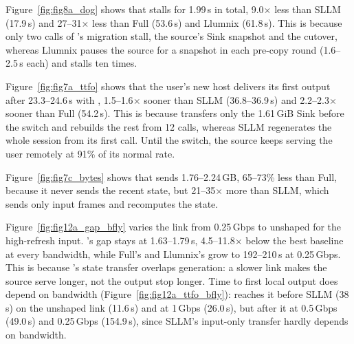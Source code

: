 Figure~\ref{fig:fig8a_dog} shows that \sys stalls for 1.99\,s in total, 9.0$\times$ less than SLLM (17.9\,s) and
27--31$\times$ less than Full (53.6\,s) and Llumnix (61.8\,s).
This is because only two calls of \sys's migration stall, the source's Sink snapshot and the cutover, whereas
Llumnix pauses the source for a snapshot in each pre-copy round (1.6--2.5\,s each) and stalls ten times.

Figure~\ref{fig:fig7a_ttfo} shows that the user's new host delivers its first output after 23.3--24.6\,s with \sys,
1.5--1.6$\times$ sooner than SLLM (36.8--36.9\,s) and 2.2--2.3$\times$ sooner than Full (54.2\,s).
This is because \sys transfers only the 1.61\,GiB Sink before the switch and rebuilds the rest from 12 calls, whereas
SLLM regenerates the whole session from its first call.
Until the switch, the source keeps serving the user remotely at 91\% of its normal rate.

Figure~\ref{fig:fig7c_bytes} shows that \sys sends 1.76--2.24\,GB, 65--73\% less than Full, because it never sends the
recent state, but 21--35$\times$ more than SLLM, which sends only input frames and recomputes the state.

Figure~\ref{fig:fig12a_gap_bfly} varies the link from 0.25\,Gbps to unshaped for the high-refresh input.
\sys's gap stays at 1.63--1.79\,s, 4.5--11.8$\times$ below the best baseline at every bandwidth, while Full's and
Llumnix's grow to 192--210\,s at 0.25\,Gbps.
This is because \sys's state transfer overlaps generation: a slower link makes the source serve longer, not the output
stop longer.
Time to first local output does depend on bandwidth (Figure~\ref{fig:fig12a_ttfo_bfly}): \sys reaches it before SLLM
(38\,s) on the unshaped link (11.6\,s) and at 1\,Gbps (26.0\,s), but after it at 0.5\,Gbps (49.0\,s) and 0.25\,Gbps
(154.9\,s), since SLLM's input-only transfer hardly depends on bandwidth.

